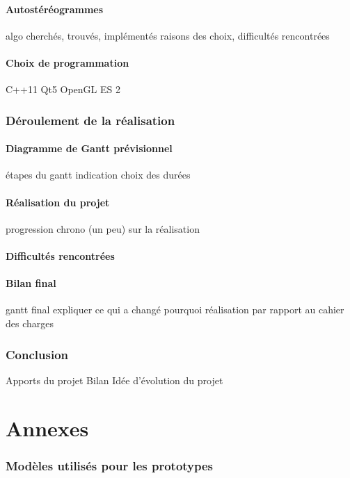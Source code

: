 \documentclass[paper=a4, fontsize=11pt]{article}
\newenvironment{changemargin}[2]{\begin{list}{}{%
      \setlength{\topsep}{0pt}%
      \setlength{\leftmargin}{0pt}%
      \setlength{\rightmargin}{0pt}%
      \setlength{\listparindent}{\parindent}%
      \setlength{\itemindent}{\parindent}%
      \setlength{\parsep}{0pt plus 1pt}%
      \addtolength{\leftmargin}{#1}%
      \addtolength{\rightmargin}{#2}%
    }\item }{\end{list}}
\numberwithin{equation}{section}		%
\numberwithin{figure}{section}			%
\numberwithin{table}{section}				%
\begin{document}
\begin{changemargin}{-1cm}{-1cm}
  \subsection{Autostéréogrammes}
  
  algo cherchés, trouvés, implémentés
  raisons des choix, difficultés rencontrées
  \subsection{Choix de programmation}
  
  C++11
  Qt5
  OpenGL ES 2

  \section{Déroulement de la réalisation}
  \subsection{Diagramme de Gantt prévisionnel}
  
  étapes du gantt
  indication choix des durées
  \subsection{Réalisation du projet}
  
  progression chrono (un peu) sur la réalisation
  \subsection{Difficultés rencontrées}
  
  \subsection{Bilan final}
  
  gantt final
  expliquer ce qui a changé
  pourquoi
  réalisation par rapport au cahier des charges

  \section{Conclusion}
  
  Apports du projet
  Bilan
  Idée d'évolution du projet

  \appendix
  \part*{Annexes}
  \section{Modèles utilisés pour les prototypes} \label{annexe:modeles}
  

\end{changemargin}
\end{document}
